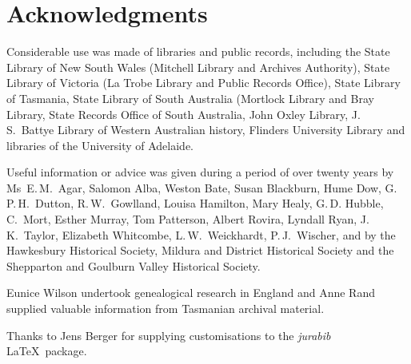 
\chapter{Acknowledgments}
\label{ch:ack}

Considerable use was made of libraries and public records, including
the State Library of New South Wales (Mitchell Library and Archives
Authority), State Library of Victoria (La Trobe Library and Public
Rec\-ords Office), State Library of Tasmania, State Library of South
Australia (Mortlock Library and Bray Library, State Records Office of
South Australia, John Oxley Library, J.\,S.~Battye Library of Western
Australian history, Flinders University Library and libraries of the
University of Adelaide.

\medskip
Useful information or advice was given during a period of over
twen\-ty years by Ms~E.\,M.~Agar, Salomon Alba, Weston Bate, Susan
Blackburn, Hume Dow, G.\,P.\,H.~Dutton, R.\,W.~Gowlland, Louisa
Hamilton, Mary Healy, G.\,D. Hubble, C.~Mort, Esther Murray, Tom
Patterson, Albert Rovira, Lyndall Ryan, J.\,K.~Taylor, Elizabeth
Whitcombe, L.\,W.~Weickhardt, P.\,J.~Wischer, and by the Hawkesbury
Historical Society, Mildura and District Historical Society and the
Shepparton and Goulburn Valley Historical Society.

\medskip
Eunice Wilson undertook genealogical research in England and Anne Rand
supplied valuable information from Tasmanian archival material.

\medskip
Thanks to Jens Berger for supplying customisations to the
\textit{jurabib} \LaTeX\ package.

